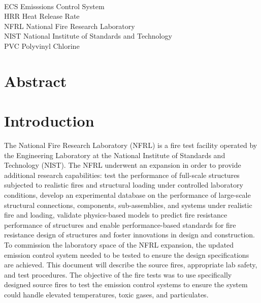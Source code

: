 \documentclass[12pt,oneside]{book}
\begin{document}
\begin{tabbing}
\hspace{1.5in} \= \\
ECS \> Emisssions Control System \\
HRR \> Heat Release Rate \\
NFRL \> National Fire Research Laboratory \\
NIST \> National Institute of Standards and Technology \\
PVC \> Polyvinyl Chlorine \\
\end{tabbing}

\mainmatter

\chapter*{\centering Abstract}

\chapter{Introduction}
\setcounter{page}{1}
The National Fire Research Laboratory (NFRL) is a fire test facility operated by the Engineering Laboratory at the National Institute of Standards and Technology (NIST). The NFRL underwent an expansion in order to provide additional research capabilities: test the performance of full-scale structures subjected to realistic fires and structural loading under controlled laboratory conditions, develop an experimental database on the performance of large-scale structural connections, components, sub-assemblies, and systems under realistic fire and loading, validate physics-based models to predict fire resistance performance of structures and enable performance-based standards for fire resistance design of structures and foster innovations in design and construction. To commission the laboratory space of the NFRL expansion, the updated emission control system needed to be tested to ensure the design specifications are achieved. This document will describe the source fires, appropriate lab safety, and test procedures. The objective of the fire tests was to use specifically designed source fires to test the emission control systems to ensure the system could handle elevated temperatures, toxic gases, and particulates.
\end{document}
